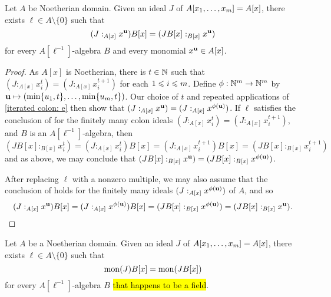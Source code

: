\documentclass{amsart}
\begin{document}


\begin{corollary}
   \label{all monomial colons: C}
   Let $A$ be Noetherian domain.
   Given an ideal $J$ of $A[x_1, \ldots, x_m] = A[x]$, there exists $\ell \in A \setminus \{0\}$ such that
   \[ (J:_{A[x]} x^{\mathbf{u}}) B[x] = (JB[x]:_{B[x]} x^{\mathbf{u}})\]
   for every $A[\ell^{-1}]$-algebra $B$ and every monomial $x^{\mathbf{u}} \in A[x]$.   
\end{corollary}

\begin{proof}
   As $A[x]$ is Noetherian, there is $t \in \mathbb{N}$ such that $(J:_{A[x]}x_i^t)=(J:_{A[x]}x_i^{t+1})$ for each $1 \leqslant i \leqslant m$.  Define $\phi:  \mathbb{N}^m \to \mathbb{N}^m$ by $\mathbf{u} \mapsto (\min\{u_1, t\}, \ldots, \min \{u_m,t\})$.  Our choice of $t$ and repeated applications of \eqref{iterated colon: e} then show that $(J:_{A[x]}x^{\mathbf{u}}) = (J:_{A[x]}x^{\phi(\mathbf{u})})$.
   If $\ell$ satisfies the conclusion of  for the finitely many colon ideals $(J:_{A[x]}x_i^t)=(J:_{A[x]}x_i^{t+1})$, and $B$ is an $A[\ell^{-1}]$-algebra, then
   \[ (JB[x]:_{B[x]} x_i^{t}) = (J:_{A[x]}x_i^{t})B[x]
                               = (J:_{A[x]}x_i^{t+1})B[x]
                               =(JB[x]:_{B[x]} x_i^{t+1}) \]
   and as above, we may conclude that $(JB[x]:_{B[x]}x^{\mathbf{u}}) = (JB[x]:_{B[x]}x^{\phi(\mathbf{u})})$.

After replacing $\ell$ with a nonzero multiple, we may also assume that the conclusion of  holds for the finitely many ideals $(J:_{A[x]} x^{\phi(\mathbf{u})})$ of $A$, and so
%
\[ (J:_{A[x]} x^{\mathbf{u}})B[x] = (J:_{A[x]} x^{\phi(\mathbf{u})})B[x] = (JB[x]:_{B[x]} x^{\phi(\mathbf{u})}) = (JB[x]:_{B[x]} x^{\mathbf{u}}). \qedhere\]
\end{proof}

\begin{theorem}
\label{mon-operation-general-expansion: T}
Let $A$ be a Noetherian domain.  Given an ideal $J$ of $A[x_1, \ldots, x_m] = A[x]$, there exists $\ell \in A \setminus \{0\}$ such that 
\[ \operatorname{mon}(J) B[x] = \operatorname{mon}(JB[x])\]
for every $A[\ell^{-1}]$-algebra $B$ \hl{that happens to be a field}.
\end{theorem}
\end{document}
